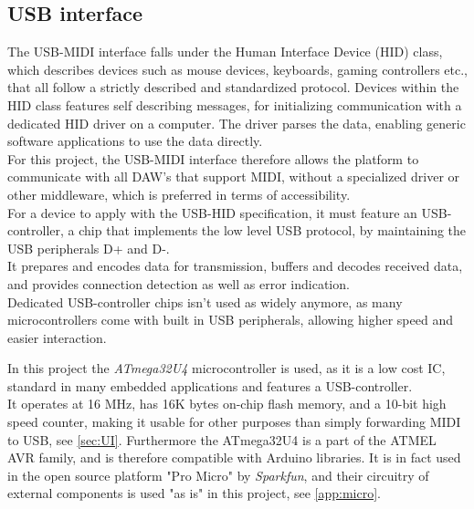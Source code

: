 \subsection{USB interface}
\label{sec:usbinterface}
The USB-MIDI interface falls under the Human Interface Device (HID) class, which describes devices such as mouse devices, keyboards, gaming controllers etc., that all follow a strictly described and standardized protocol. Devices within the HID class features self describing messages, for initializing communication with a dedicated HID driver on a computer. The driver parses the data, enabling generic software applications to use the data directly.\cite{HID} \\
For this project, the USB-MIDI interface therefore allows the platform to communicate with all DAW's that support MIDI, without a specialized driver or other middleware, which is preferred in terms of accessibility.\\

For a device to apply with the USB-HID specification, it must feature an USB-controller, a chip that implements the low level USB protocol, by maintaining the USB peripherals D+ and D-.\\ 
It prepares and encodes data for transmission, buffers and decodes received data, and provides connection detection as well as error indication.\\
Dedicated USB-controller chips isn't used as widely anymore, as many microcontrollers come with built in USB peripherals, allowing higher speed and easier interaction. 

In this project the \textit{ATmega32U4} microcontroller is used, as it is a low cost IC, standard in many embedded applications and features a USB-controller. \\
It operates at 16 MHz, has 16K bytes on-chip flash memory, and a 10-bit high speed counter, making it usable for other purposes than simply forwarding MIDI to USB, see \cref{sec:UI}.
Furthermore the ATmega32U4 is a part of the ATMEL AVR family, and is therefore compatible with Arduino libraries. It is in fact used in the open source platform "Pro Micro" by \textit{Sparkfun}, and their circuitry of external components is used "as is" in this project, see \cref{app:micro}.

